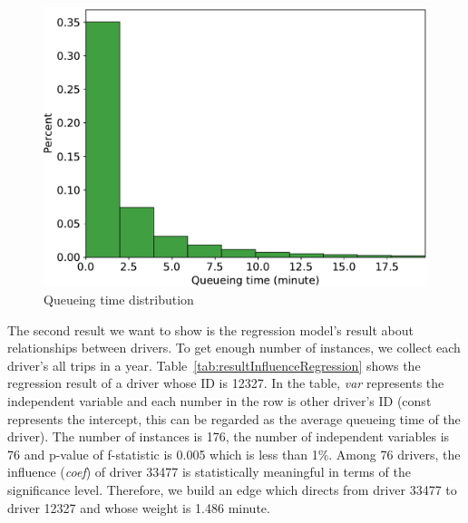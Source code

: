 \documentclass{article}
\begin{document}
\begin{figure} [h]
  \centering
  \includegraphics[width=.9\linewidth]{figs/queueTimeDist}
  \caption{Queueing time distribution}
  \label{fig:queueTimeDist}
\end{figure}


The second result we want to show is the regression model's result about relationships between drivers. To get enough number of instances, we collect each driver's all trips in a year. Table~\ref{tab:resultInfluenceRegression} shows the regression result of a driver whose ID is 12327. In the table, \emph{var} represents the independent variable and each number in the row is other driver's ID (const represents the intercept, this can be regarded as the average queueing time of the driver). The number of instances is 176, the number of independent variables is 76 and  p-value of f-statistic is 0.005 which is less than 1\%. Among 76 drivers, the influence (\emph{coef}) of driver 33477 is statistically meaningful in terms of the significance level. Therefore, we build an edge which directs from driver 33477 to driver 12327 and whose weight is 1.486 minute.
\end{document}
